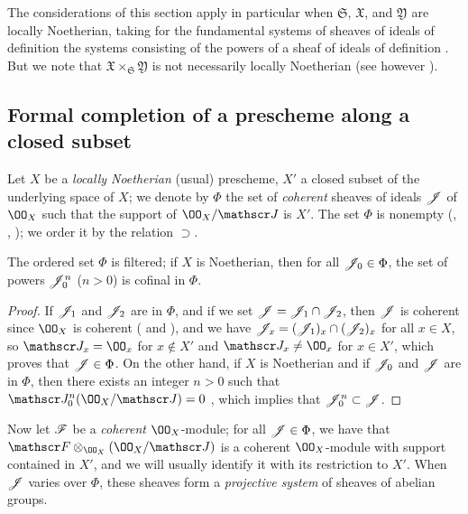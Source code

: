\begin{env}[10.7.4]
The considerations of this section apply in particular when $\mathfrak{S}$, $\mathfrak{X}$, and $\mathfrak{Y}$ are locally Noetherian, taking for the fundamental systems of sheaves of ideals of definition the systems consisting of the powers of a sheaf of ideals of definition .
But we note that $\mathfrak{X}\times_\mathfrak{S}\mathfrak{Y}$ is not necessarily locally Noetherian (see however ).
\end{env}

\subsection{Formal completion of a prescheme along a closed subset}
\label{subsection:1.10.8}

\begin{env}[10.8.1]
\label{1.10.8.1}
Let $X$ be a \emph{locally Noetherian} (usual) prescheme, $X'$ a closed subset of the underlying space of $X$; we denote by $\Phi$ the set of \emph{coherent} sheaves of ideals $\mathscr{J}$ of $\OO_X$ such that the support of $\OO_X/\sh{J}$ is $X'$.
The set $\Phi$ is nonempty (, , ); we order it by the relation $\supset$.
\end{env}

\begin{lem}[10.8.2]
\label{1.10.8.2}
The ordered set $\Phi$ is filtered; if $X$ is Noetherian, then for all $\mathscr{J}_0\in\Phi$, the set of powers $\mathscr{J}_0^n$ ($n>0$) is cofinal in $\Phi$.
\end{lem}

\begin{proof}
\label{proof-1.10.8.2}
If $\mathscr{J}_1$ and $\mathscr{J}_2$ are in $\Phi$, and if we set $\mathscr{J}=\mathscr{J}_1\cap\mathscr{J}_2$, then $\mathscr{J}$ is coherent since $\OO_X$ is coherent ( and ), and we have $\mathscr{J}_x=(\mathscr{J}_1)_x\cap(\mathscr{J}_2)_x$ for all $x\in X$, so $\sh{J}_x=\OO_x$ for $x\not\in X'$ and $\sh{J}_x\neq\OO_x$ for $x\in X'$, which proves that $\mathscr{J}\in\Phi$.
On the other hand, if $X$ is Noetherian and if $\mathscr{J}_0$ and $\mathscr{J}$ are in $\Phi$, then there exists an integer $n>0$ such that $\sh{J}_0^n(\OO_X/\sh{J})=0$ , which implies that $\mathscr{J}_0^n\subset\mathscr{J}$.
\end{proof}

\begin{env}[10.8.3]
\label{1.10.8.2}
Now let $\mathscr{F}$ be a \emph{coherent} $\OO_X$-module; for all $\mathscr{J}\in\Phi$, we have that $\sh{F}\otimes_{\OO_X}(\OO_X/\sh{J})$ is a coherent $\OO_X$-module  with support contained in $X'$, and we will usually identify it with its restriction to $X'$.
When $\mathscr{J}$ varies over $\Phi$, these sheaves form a \emph{projective system} of sheaves of abelian groups.
\end{env}


